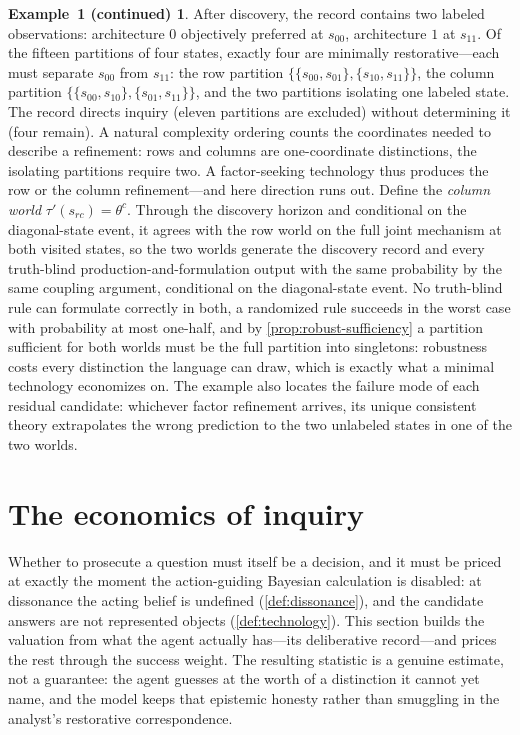 \documentclass[11pt]{article}
\theoremstyle{definition}
\newtheorem*{excont}{Example~1 (continued)}
\begin{document}
\begin{excont}
After discovery, the record contains two labeled observations: architecture $0$ objectively preferred at $s_{00}$, architecture $1$ at $s_{11}$.
Of the fifteen partitions of four states, exactly four are minimally restorative---each must separate $s_{00}$ from $s_{11}$: the row partition $\{\{s_{00},s_{01}\},\{s_{10},s_{11}\}\}$, the column partition $\{\{s_{00},s_{10}\},\{s_{01},s_{11}\}\}$, and the two partitions isolating one labeled state.
The record directs inquiry (eleven partitions are excluded) without determining it (four remain).
A natural complexity ordering counts the coordinates needed to describe a refinement: rows and columns are one-coordinate distinctions, the isolating partitions require two.
A factor-seeking technology thus produces the row or the column refinement---and here direction runs out.
Define the \emph{column world} $\tau'(s_{rc})=\theta^{c}$.
Through the discovery horizon and conditional on the diagonal-state event, it agrees with the row world on the full joint mechanism at both visited states, so the two worlds generate the discovery record and every truth-blind production-and-formulation output with the same probability by the same coupling argument, conditional on the diagonal-state event.
No truth-blind rule can formulate correctly in both, a randomized rule succeeds in the worst case with probability at most one-half, and by \cref{prop:robust-sufficiency} a partition sufficient for both worlds must be the full partition into singletons: robustness costs every distinction the language can draw, which is exactly what a minimal technology economizes on.
The example also locates the failure mode of each residual candidate: whichever factor refinement arrives, its unique consistent theory extrapolates the wrong prediction to the two unlabeled states in one of the two worlds.
\end{excont}
\section{The economics of inquiry}
\label{sec:economics}

Whether to prosecute a question must itself be a decision, and it must be priced at exactly the moment the action-guiding Bayesian calculation is disabled: at dissonance the acting belief is undefined (\cref{def:dissonance}), and the candidate answers are not represented objects (\cref{def:technology}).
This section builds the valuation from what the agent actually has---its deliberative record---and prices the rest through the success weight.
The resulting statistic is a genuine estimate, not a guarantee: the agent guesses at the worth of a distinction it cannot yet name, and the model keeps that epistemic honesty rather than smuggling in the analyst's restorative correspondence.
\end{document}
